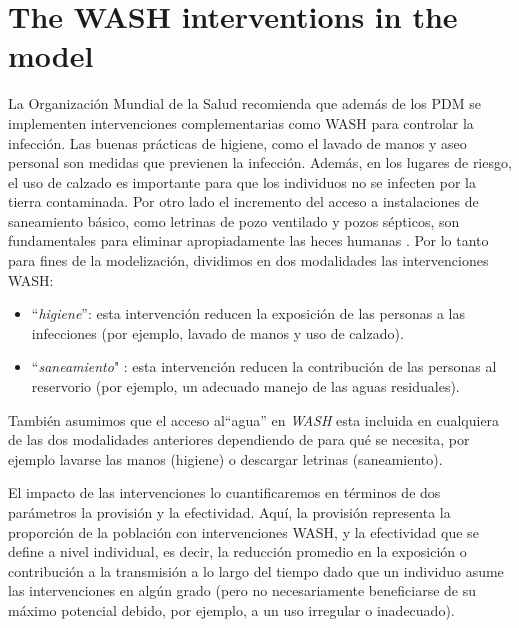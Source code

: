 \documentclass[12pt,a4paper]{article}
\theoremstyle{plain}%
\theoremstyle{definition}
\theoremstyle{remark}
\begin{document}
	\section{The WASH interventions in the model}
	La Organización Mundial de la Salud recomienda que además de los PDM  se implementen intervenciones complementarias como WASH para 
	controlar la infección.
	Las buenas prácticas de higiene, como el lavado de manos y aseo personal son medidas que previenen la infección. Además, en los lugares de riesgo, el uso de calzado es importante para que los individuos no se infecten por la tierra contaminada. Por otro lado %
	el incremento del acceso a instalaciones de saneamiento básico, como letrinas de pozo ventilado y pozos sépticos, son fundamentales para eliminar apropiadamente las heces humanas \cite{paho2003,who2012soil}.
	  Por lo tanto
	  para fines de la modelización, dividimos en dos modalidades las intervenciones WASH: 
	\begin{itemize}
		\item ``\textit{higiene}'': esta intervención reducen la exposición de las personas a las infecciones (por ejemplo, lavado de manos y uso de calzado).
		\item ``\textit{saneamiento}" : esta intervención reducen la contribución de las personas al reservorio (por ejemplo, %
		un adecuado manejo de las aguas residuales).
	\end{itemize}
	También
	asumimos que el acceso al``agua'' en \textit{WASH} esta incluida en cualquiera de las dos modalidades anteriores  dependiendo de para qué se necesita, por ejemplo  lavarse las manos (higiene) o descargar letrinas (saneamiento)\cite{coffeng2018predicted}.
	
	El impacto de las intervenciones lo cuantificaremos en términos
	de dos parámetros la provisión y la efectividad. 	
	 Aquí, la provisión  representa la proporción de la población con intervenciones WASH, y la efectividad que se define a nivel individual, es decir, la reducción promedio en la exposición o contribución a la transmisión a lo largo del tiempo dado que un individuo asume las intervenciones en algún grado (pero no necesariamente beneficiarse de su máximo potencial debido, por ejemplo, a un uso irregular o inadecuado).
	 
\end{document}
